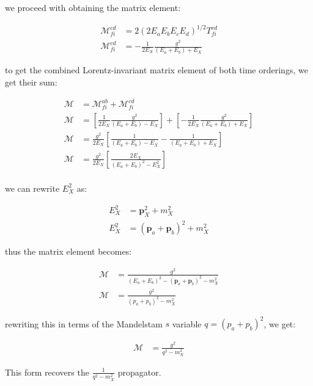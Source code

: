 \documentclass[11pt]{article}
\theoremstyle{definition}
\begin{document}
we proceed with obtaining the matrix element:

\begin{align}
    \mathcal{M}_{fi}^{cd} &= 2(2E_aE_bE_cE_d)^{1/2} T_{fi}^{cd}\\
    \mathcal{M}_{fi}^{cd} &= -\frac{1}{2E_X} \frac{g^2}{(E_a+E_b)+E_X}
\end{align}

to get the combined Lorentz-invariant matrix element of both time orderings, we get their sum:

\begin{align}
    \mathcal{M} &=
    \mathcal{M}_{fi}^{ab}+\mathcal{M}_{fi}^{cd}\\
    \mathcal{M} &= \left[\frac{1}{2E_X} \frac{g^2}{(E_a+E_b)-E_X}\right] + \left[-\frac{1}{2E_X} \frac{g^2}{(E_a+E_b)+E_X}\right]\\
    \mathcal{M} &= \frac{g^2}{2E_X} \left[ \frac{1}{(E_a+E_b)-E_X} - \frac{1}{(E_a+E_b)+E_X} \right]\\
    \mathcal{M} &= \frac{g^2}{2E_X} \left[ \frac{2E_X}{(E_a+E_b)^2 - E_X^2} \right]\\
\end{align}

we can rewrite $E_X^2$ as:

\begin{align}
    E_X^2 &= \mathbf{p}_X^2 + m_X^2\\
    E_X^2 &= (\mathbf{p}_a + \mathbf{p}_b)^2 + m_X^2
\end{align}

thus the matrix element becomes:

\begin{align}
    \mathcal{M} &= \frac{g^2}{(E_a+E_b)^2 - (\mathbf{p}_a + \mathbf{p}_b)^2 - m_X^2}\\
    \mathcal{M} &= \frac{g^2}{ (p_a + p_b)^2 - m_X^2} 
\end{align}

rewriting this in terms of the Mandelstam $s$ variable $q=(p_a + p_b)^2$, we get:

\begin{align}
    \mathcal{M} &= \frac{g^2}{ q^2 - m_X^2}
\end{align}

\begin{mdframed}
    This form recovers the $\frac{1}{q^2 - m_X^2}$ propagator.
\end{mdframed}

\end{document}
